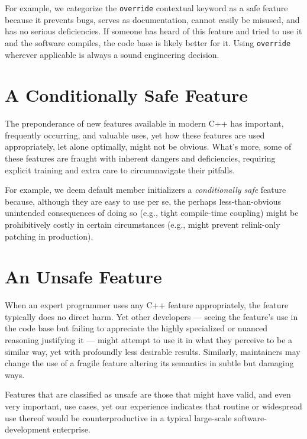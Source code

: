 For example, we categorize the \texttt{override} contextual keyword as a safe feature because it prevents bugs, serves as documentation, cannot easily be misused, and has no serious deficiencies. If someone has heard of this feature and tried to use it and the software compiles, the code base is likely better for it. Using \texttt{override} wherever applicable is always a sound engineering decision.

\section[A {\sffamily\itshape Conditionally Safe} Feature]{A {\sfbsectionitalRomeo Conditionally Safe} Feature}

The preponderance of new features available in modern C++ has important, frequently occurring, and valuable uses, yet how these features are used appropriately, let alone optimally, might not be obvious. What’s more, some of these features are fraught with inherent dangers and deficiencies, requiring explicit training and extra care to circumnavigate their pitfalls.

For example, we deem default member initializers a \textit{conditionally safe} feature because, although they are easy to use per se, the perhaps less-than-obvious unintended consequences of doing so (e.g., tight compile-time coupling) might be prohibitively costly in certain circumstances (e.g., might prevent relink-only patching in production).

\section[An {\sffamily\itshape Unsafe} Feature]{An {\sfbsectionitalRomeo Unsafe} Feature}

When an expert programmer uses any C++ feature appropriately, the feature typically does no direct harm. Yet other developers --- seeing the feature’s use in the code base but failing to appreciate the highly specialized or nuanced reasoning justifying it --- might attempt to use it in what they perceive to be a similar way, yet with profoundly less desirable results. Similarly, maintainers may change the use of a fragile feature altering its semantics in subtle but damaging ways.

Features that are classified as unsafe are those that might have valid, and even very important, use cases, yet our experience indicates that routine or widespread use thereof would be counterproductive in a typical large-scale software-development enterprise.

